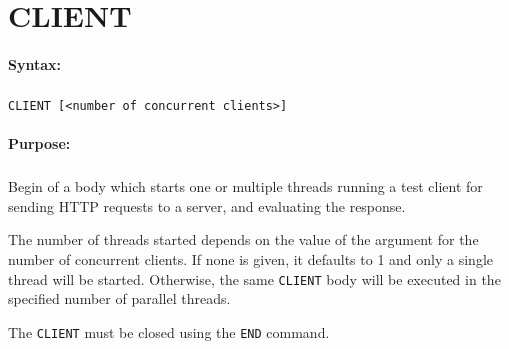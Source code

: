 
\newpage
\section{CLIENT}
\label{cmd:CLIENT}

\paragraph{Syntax:}
\subparagraph{}
\texttt{CLIENT [<number of concurrent clients>]}

\paragraph{Purpose:}
\subparagraph{}
Begin of a body which starts one or multiple threads running a test client for sending 
HTTP requests to a server, and evaluating the response.

The number of threads started depends on the value of the argument for 
the number of concurrent clients. If none is given, it defaults to 1 and 
only a single thread will be started. Otherwise, the same \texttt{CLIENT} body will 
be executed in the specified number of parallel threads.

The \texttt{CLIENT} must be closed using the \texttt{END} command.